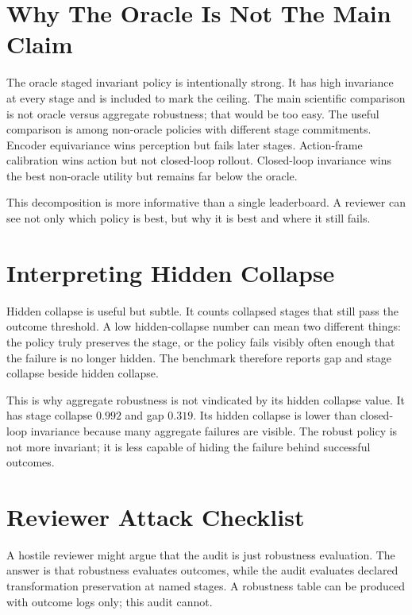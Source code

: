 \documentclass{article}
\begin{document}
\section{Why The Oracle Is Not The Main Claim}

The oracle staged invariant policy is intentionally strong. It has high invariance at every stage and is included to mark the ceiling. The main scientific comparison is not oracle versus aggregate robustness; that would be too easy. The useful comparison is among non-oracle policies with different stage commitments. Encoder equivariance wins perception but fails later stages. Action-frame calibration wins action but not closed-loop rollout. Closed-loop invariance wins the best non-oracle utility but remains far below the oracle.

This decomposition is more informative than a single leaderboard. A reviewer can see not only which policy is best, but why it is best and where it still fails.

\section{Interpreting Hidden Collapse}

Hidden collapse is useful but subtle. It counts collapsed stages that still pass the outcome threshold. A low hidden-collapse number can mean two different things: the policy truly preserves the stage, or the policy fails visibly often enough that the failure is no longer hidden. The benchmark therefore reports gap and stage collapse beside hidden collapse.

This is why aggregate robustness is not vindicated by its hidden collapse value. It has stage collapse $0.992$ and gap $0.319$. Its hidden collapse is lower than closed-loop invariance because many aggregate failures are visible. The robust policy is not more invariant; it is less capable of hiding the failure behind successful outcomes.

\section{Reviewer Attack Checklist}

A hostile reviewer might argue that the audit is just robustness evaluation. The answer is that robustness evaluates outcomes, while the audit evaluates declared transformation preservation at named stages. A robustness table can be produced with outcome logs only; this audit cannot.
\end{document}
